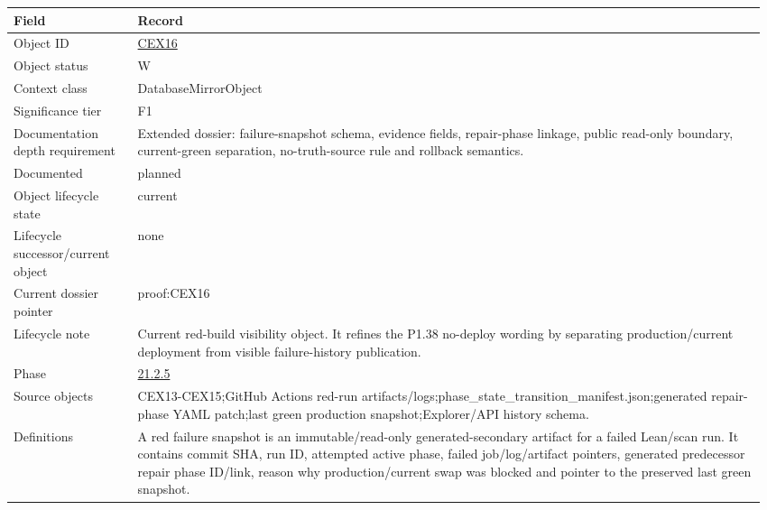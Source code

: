 \begin{longtable}{L{0.16\linewidth} L{0.81\linewidth}}
\hline
\textbf{Field} & \textbf{Record}\\
\hline
Object ID & \hyperlink{object-row-CEX16}{CEX16}\\
\hline\addlinespace[0.20em]
Object status & W\\
\hline\addlinespace[0.20em]
Context class & DatabaseMirrorObject\\
\hline\addlinespace[0.20em]
Significance tier & F1\\
\hline\addlinespace[0.20em]
Documentation depth requirement & Extended dossier: failure-snapshot schema, evidence fields, repair-phase linkage, public read-only boundary, current-green separation, no-truth-source rule and rollback semantics.\\
\hline\addlinespace[0.20em]
Documented & planned\\
\hline\addlinespace[0.20em]
Object lifecycle state & current\\
\hline\addlinespace[0.20em]
Lifecycle successor/\allowbreak{}current object & none\\
\hline\addlinespace[0.20em]
Current dossier pointer & proof:CEX16\\
\hline\addlinespace[0.20em]
Lifecycle note & Current red-build visibility object. It refines the P1.38 no-deploy wording by separating production/\allowbreak{}current deployment from visible failure-history publication.\\
\hline\addlinespace[0.20em]
Phase & \hyperlink{phase-row-21-2-5}{21.2.5}\\
\hline\addlinespace[0.20em]
Source objects & CEX13-CEX15;\newline GitHub Actions red-run artifacts/\allowbreak{}logs;\newline phase\_state\_transition\_manifest.json;\newline generated repair-phase YAML patch;\newline last green production snapshot;\newline Explorer/\allowbreak{}API history schema.\\
\hline\addlinespace[0.20em]
Definitions & A red failure snapshot is an immutable/\allowbreak{}read-only generated-secondary artifact for a failed Lean/\allowbreak{}scan run. It contains commit SHA, run ID, attempted active phase, failed job/\allowbreak{}log/\allowbreak{}artifact pointers, generated predecessor repair phase ID/\allowbreak{}link, reason why production/\allowbreak{}current swap was blocked and pointer to the preserved last green snapshot.\\

\end{longtable}
